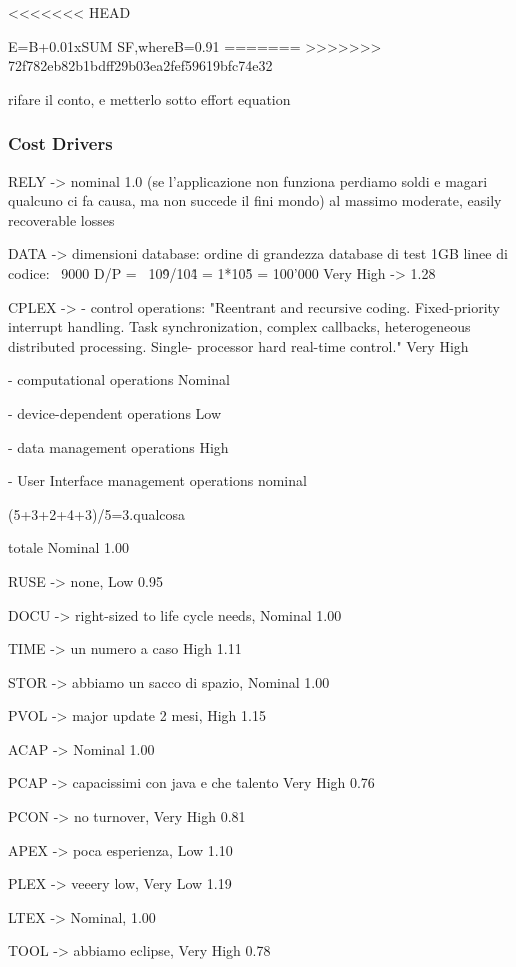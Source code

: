 \documentclass[english]{article}
\begin{document}
<<<<<<< HEAD

E=B+0.01xSUM SF,whereB=0.91
=======
>>>>>>> 72f782eb82b1bdff29b03ea2fef59619bfc74e32

rifare il conto, e metterlo sotto effort equation

\subsubsection{Cost Drivers}

RELY -> nominal 1.0 (se l'applicazione non funziona perdiamo soldi e magari qualcuno ci fa causa, ma non succede il fini mondo) al massimo moderate, easily recoverable losses

DATA ->  
dimensioni database: ordine di grandezza database di test 1GB %
linee di codice: ~9000
D/P = ~10\^9/10\^4 = 1*10\^5 = 100'000
Very High -> 1.28

CPLEX ->
- control operations:
"Reentrant and recursive coding. Fixed-priority interrupt
handling. Task
synchronization,
complex
callbacks,
heterogeneous
distributed
processing.
Single-
processor hard
real-time control."
Very High

- computational operations
Nominal

- device-dependent operations
Low

- data management operations
High

- User Interface management operations
nominal

(5+3+2+4+3)/5=3.qualcosa

totale Nominal 1.00

RUSE -> none, Low 0.95

DOCU -> right-sized to life cycle needs, Nominal 1.00

TIME -> un numero a caso High 1.11

STOR -> abbiamo un sacco di spazio, Nominal 1.00

PVOL -> major update 2 mesi, High 1.15

ACAP -> Nominal 1.00

PCAP -> capacissimi con java e che talento Very High 0.76

PCON -> no turnover, Very High 0.81

APEX -> poca esperienza, Low 1.10

PLEX -> veeery low, Very Low 1.19

LTEX -> Nominal, 1.00

TOOL -> abbiamo eclipse, Very High 0.78
\end{document}
